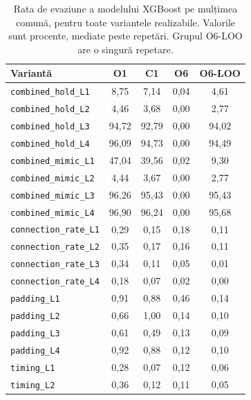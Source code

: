 \begin{table}[!ht]
    \caption{Rata de evaziune a modelului XGBoost pe mulțimea comună, pentru toate variantele realizabile. Valorile sunt procente, mediate peste repetări. Grupul O6-LOO are o singură repetare.}
    \centering\footnotesize
    \begin{tabular}{|l|c|c|c|c|}
        \hline
        \textbf{Variantă} & \textbf{O1} & \textbf{C1} & \textbf{O6} & \textbf{O6-LOO} \\
        \hline
        \texttt{combined\_hold\_L1} & 8,75 & 7,14 & 0,04 & 4,61 \\
        \hline
        \texttt{combined\_hold\_L2} & 4,46 & 3,68 & 0,00 & 2,77 \\
        \hline
        \texttt{combined\_hold\_L3} & 94,72 & 92,79 & 0,00 & 94,02 \\
        \hline
        \texttt{combined\_hold\_L4} & 96,09 & 94,73 & 0,00 & 94,49 \\
        \hline
        \texttt{combined\_mimic\_L1} & 47,04 & 39,56 & 0,02 & 9,30 \\
        \hline
        \texttt{combined\_mimic\_L2} & 4,44 & 3,67 & 0,00 & 2,77 \\
        \hline
        \texttt{combined\_mimic\_L3} & 96,26 & 95,43 & 0,00 & 95,43 \\
        \hline
        \texttt{combined\_mimic\_L4} & 96,90 & 96,24 & 0,00 & 95,68 \\
        \hline
        \texttt{connection\_rate\_L1} & 0,29 & 0,15 & 0,18 & 0,11 \\
        \hline
        \texttt{connection\_rate\_L2} & 0,35 & 0,17 & 0,16 & 0,11 \\
        \hline
        \texttt{connection\_rate\_L3} & 0,34 & 0,11 & 0,05 & 0,01 \\
        \hline
        \texttt{connection\_rate\_L4} & 0,18 & 0,07 & 0,02 & 0,00 \\
        \hline
        \texttt{padding\_L1} & 0,91 & 0,88 & 0,46 & 0,14 \\
        \hline
        \texttt{padding\_L2} & 0,66 & 1,00 & 0,14 & 0,10 \\
        \hline
        \texttt{padding\_L3} & 0,61 & 0,49 & 0,13 & 0,09 \\
        \hline
        \texttt{padding\_L4} & 0,92 & 0,88 & 0,12 & 0,10 \\
        \hline
        \texttt{timing\_L1} & 0,28 & 0,07 & 0,12 & 0,06 \\
        \hline
        \texttt{timing\_L2} & 0,36 & 0,12 & 0,11 & 0,05 \\

\end{tabular}
\end{table}
